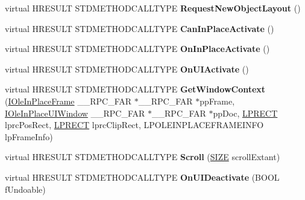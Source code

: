 \begin{DoxyCompactItemize}
\mbox{\label{struct_ole_in_place_client_a18e0d5e679aab85eeea84a07c09e8b8d}} 
virtual H\+R\+E\+S\+U\+LT S\+T\+D\+M\+E\+T\+H\+O\+D\+C\+A\+L\+L\+T\+Y\+PE {\bfseries Request\+New\+Object\+Layout} ()
\item 
\mbox{\label{struct_ole_in_place_client_a06034106e7caac8136e9a1338eb449e3}} 
virtual H\+R\+E\+S\+U\+LT S\+T\+D\+M\+E\+T\+H\+O\+D\+C\+A\+L\+L\+T\+Y\+PE {\bfseries Can\+In\+Place\+Activate} ()
\item 
\mbox{\label{struct_ole_in_place_client_a0109ea3d0636ff9d8f3478a52e4cdf07}} 
virtual H\+R\+E\+S\+U\+LT S\+T\+D\+M\+E\+T\+H\+O\+D\+C\+A\+L\+L\+T\+Y\+PE {\bfseries On\+In\+Place\+Activate} ()
\item 
\mbox{\label{struct_ole_in_place_client_ad4732b646c3efbdf2a4711a0ff276e02}} 
virtual H\+R\+E\+S\+U\+LT S\+T\+D\+M\+E\+T\+H\+O\+D\+C\+A\+L\+L\+T\+Y\+PE {\bfseries On\+U\+I\+Activate} ()
\item 
\mbox{\label{struct_ole_in_place_client_a7342cecd4d4dcf6fbb7057bc0220f362}} 
virtual H\+R\+E\+S\+U\+LT S\+T\+D\+M\+E\+T\+H\+O\+D\+C\+A\+L\+L\+T\+Y\+PE {\bfseries Get\+Window\+Context} (\hyperlink{interface_i_ole_in_place_frame}{I\+Ole\+In\+Place\+Frame} \+\_\+\+\_\+\+R\+P\+C\+\_\+\+F\+AR $\ast$\+\_\+\+\_\+\+R\+P\+C\+\_\+\+F\+AR $\ast$pp\+Frame, \hyperlink{interface_i_ole_in_place_u_i_window}{I\+Ole\+In\+Place\+U\+I\+Window} \+\_\+\+\_\+\+R\+P\+C\+\_\+\+F\+AR $\ast$\+\_\+\+\_\+\+R\+P\+C\+\_\+\+F\+AR $\ast$pp\+Doc, \hyperlink{structtag_r_e_c_t}{L\+P\+R\+E\+CT} lprc\+Pos\+Rect, \hyperlink{structtag_r_e_c_t}{L\+P\+R\+E\+CT} lprc\+Clip\+Rect, L\+P\+O\+L\+E\+I\+N\+P\+L\+A\+C\+E\+F\+R\+A\+M\+E\+I\+N\+FO lp\+Frame\+Info)
\item 
\mbox{\label{struct_ole_in_place_client_ade251674745c3b78a565cc103dcbea6b}} 
virtual H\+R\+E\+S\+U\+LT S\+T\+D\+M\+E\+T\+H\+O\+D\+C\+A\+L\+L\+T\+Y\+PE {\bfseries Scroll} (\hyperlink{structtag_s_i_z_e}{S\+I\+ZE} scroll\+Extant)
\item 
\mbox{\label{struct_ole_in_place_client_acd11677cf4e015bbb8c1b13fd865516a}} 
virtual H\+R\+E\+S\+U\+LT S\+T\+D\+M\+E\+T\+H\+O\+D\+C\+A\+L\+L\+T\+Y\+PE {\bfseries On\+U\+I\+Deactivate} (B\+O\+OL f\+Undoable)

\end{DoxyCompactItemize}
